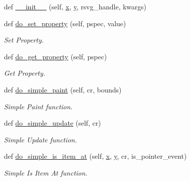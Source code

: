 \begin{DoxyCompactItemize}
\item 
def \hyperlink{classvisualizer_1_1svgitem_1_1SvgItem_aef16298ff49afba14fcefde564d652ff}{\+\_\+\+\_\+init\+\_\+\+\_\+} (self, \hyperlink{classvisualizer_1_1svgitem_1_1SvgItem_a2e9c288d8f56a32ef5e421f2a18da8d2}{x}, \hyperlink{classvisualizer_1_1svgitem_1_1SvgItem_aa578d8ef1d07a7489ba5e5ae3db9c999}{y}, rsvg\+\_\+handle, kwargs)
\item 
def \hyperlink{classvisualizer_1_1svgitem_1_1SvgItem_aba861cb67beda41cc0b4a253ec2aaad3}{do\+\_\+set\+\_\+property} (self, pspec, value)
\begin{DoxyCompactList}\small\item\em Set Property. \end{DoxyCompactList}\item 
def \hyperlink{classvisualizer_1_1svgitem_1_1SvgItem_a6829b2d9f78f8fee9f51904d82212843}{do\+\_\+get\+\_\+property} (self, pspec)
\begin{DoxyCompactList}\small\item\em Get Property. \end{DoxyCompactList}\item 
def \hyperlink{classvisualizer_1_1svgitem_1_1SvgItem_aa6644238093622e90c7f4568b278bda1}{do\+\_\+simple\+\_\+paint} (self, cr, bounds)
\begin{DoxyCompactList}\small\item\em Simple Paint function. \end{DoxyCompactList}\item 
def \hyperlink{classvisualizer_1_1svgitem_1_1SvgItem_a14724f570ede525807a1148b1295e443}{do\+\_\+simple\+\_\+update} (self, cr)
\begin{DoxyCompactList}\small\item\em Simple Update function. \end{DoxyCompactList}\item 
def \hyperlink{classvisualizer_1_1svgitem_1_1SvgItem_a4f3daac792b60ab4504a04599d96bfc2}{do\+\_\+simple\+\_\+is\+\_\+item\+\_\+at} (self, \hyperlink{classvisualizer_1_1svgitem_1_1SvgItem_a2e9c288d8f56a32ef5e421f2a18da8d2}{x}, \hyperlink{classvisualizer_1_1svgitem_1_1SvgItem_aa578d8ef1d07a7489ba5e5ae3db9c999}{y}, cr, is\+\_\+pointer\+\_\+event)
\begin{DoxyCompactList}\small\item\em Simple Is Item At function. \end{DoxyCompactList}\end{DoxyCompactItemize}
